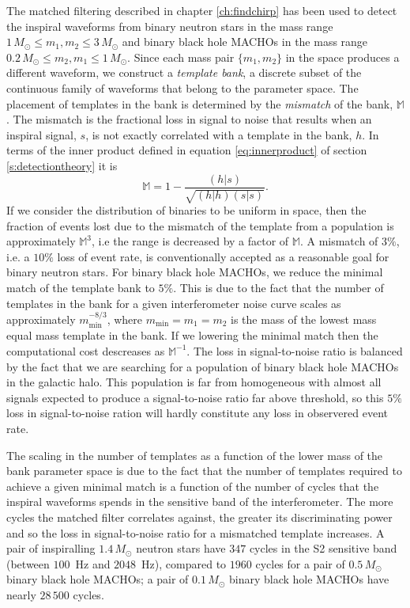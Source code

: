 The matched filtering described in chapter \ref{ch:findchirp} has been used to
detect the inspiral waveforms from binary neutron stars in the mass range
$1\,M_\odot\le m_1, m_2\le 3\,M_\odot$ and binary black hole MACHOs in the
mass range $0.2\,M_\odot\le m_2, m_1\le 1\,M_\odot$. Since each mass pair
$\{m_1,m_2\}$ in the space produces a different waveform, we construct a {\em
template bank}, a discrete subset of the continuous family of waveforms that
belong to the parameter space. The placement of templates in the bank is
determined by the \emph{mismatch} of the bank, $\mathbb{M}$. The mismatch is
the fractional loss in signal to noise that results when an inspiral signal,
$s$, is not exactly correlated with a template in the bank, $h$. In terms of
the inner product defined in equation \ref{eq:innerproduct} of section
\ref{s:detectiontheory} it is
\begin{equation}
\mathbb{M} = 1 - \frac{(h|s)} {\sqrt{(h|h)(s|s)}}.
\end{equation}
If we consider the distribution of binaries to be uniform in space, then the
fraction of events lost due to the mismatch of the template from a population
is approximately $\mathbb{M}^3$, i.e the range is decreased by a factor of
$\mathbb{M}$. A mismatch of $3\%$, i.e. a $10\%$ loss of event rate, is
conventionally accepted as a reasonable goal for binary neutron stars. For
binary black hole MACHOs, we reduce the minimal match of the template bank to
$5\%$. This is due to the fact that the number of templates in the bank for a
given interferometer noise curve scales as approximately
$m_\mathrm{min}^{-8/3}$, where $m_\mathrm{min} = m_1 = m_2$ is the mass of the
lowest mass equal mass template in the bank\cite{Owen:1998dk}. If we lowering
the minimal match then the computational cost descreases as $\mathbb{M}^{-1}$.
The loss in signal-to-noise ratio is balanced by the fact that we are
searching for a population of binary black hole MACHOs in the galactic halo.
This population is far from homogeneous with almost all signals expected to
produce a signal-to-noise ratio far above threshold, so this $5\%$ loss in
signal-to-noise ration will hardly constitute any loss in observered event
rate.

The scaling in the number of templates as a function of the lower mass of the
bank parameter space is due to the fact that the number of templates required
to achieve a given minimal match is a function of the number of cycles that the
inspiral waveforms spends in the sensitive band of the interferometer. The
more cycles the matched filter correlates against, the greater its
discriminating power and so the loss in signal-to-noise ratio for a mismatched
template increases. A pair of inspiralling $1.4\,M_\odot$ neutron stars have
$347$ cycles in the S2 sensitive band (between $100$~Hz and $2048$~Hz),
compared to $1960$ cycles for a pair of $0.5\,M_\odot$ binary black hole
MACHOs; a pair of $0.1\,M_\odot$ binary black hole MACHOs have nearly
$28\,500$ cycles.

